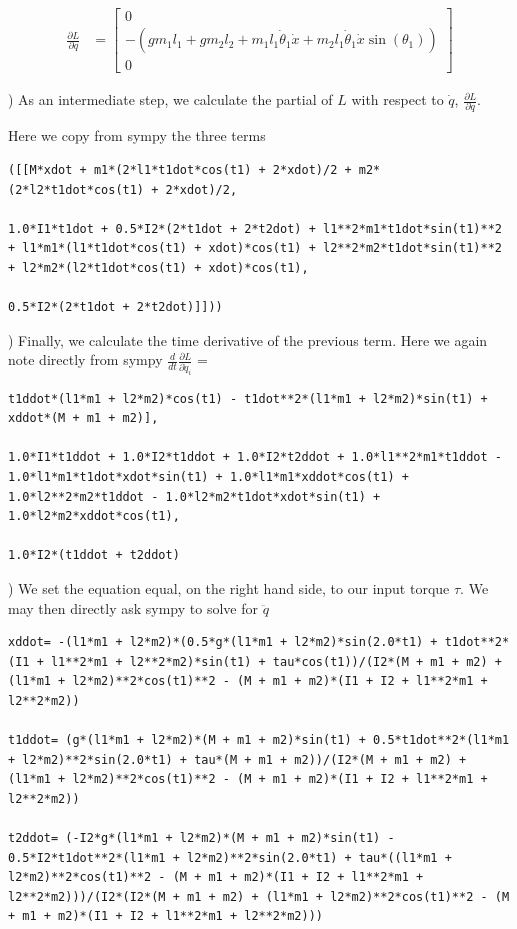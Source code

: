 \documentclass[conference]{IEEEtran}
\begin{document}
\begin{align*}
    \frac{\partial L}{\partial q} &=
    \begin{bmatrix}
        0 \\
        -(g m_1 l_1 + g m_2 l_2 + m_1 l_1 \dot \theta_1 \dot x + m_2 l_1 \dot \theta_1 \dot x \sin(\theta_1))\\
        0
    \end{bmatrix}
\end{align*}

) As an intermediate step, we calculate the partial of $L$ with
respect to $\dot q$,  $\frac{\partial L}{\partial \dot q}$.

Here we copy from sympy the three terms

\begin{lstlisting}
([[M*xdot + m1*(2*l1*t1dot*cos(t1) + 2*xdot)/2 + m2*(2*l2*t1dot*cos(t1) + 2*xdot)/2, 

1.0*I1*t1dot + 0.5*I2*(2*t1dot + 2*t2dot) + l1**2*m1*t1dot*sin(t1)**2 + l1*m1*(l1*t1dot*cos(t1) + xdot)*cos(t1) + l2**2*m2*t1dot*sin(t1)**2 + l2*m2*(l2*t1dot*cos(t1) + xdot)*cos(t1), 

0.5*I2*(2*t1dot + 2*t2dot)]]))
\end{lstlisting}


) Finally, we calculate the time derivative of the previous term.
Here we again note directly from sympy $\frac{d}{dt} \frac{\partial L}{\partial
\dot q_i}$ = 

\begin{lstlisting}
t1ddot*(l1*m1 + l2*m2)*cos(t1) - t1dot**2*(l1*m1 + l2*m2)*sin(t1) + xddot*(M + m1 + m2)],

1.0*I1*t1ddot + 1.0*I2*t1ddot + 1.0*I2*t2ddot + 1.0*l1**2*m1*t1ddot - 1.0*l1*m1*t1dot*xdot*sin(t1) + 1.0*l1*m1*xddot*cos(t1) + 1.0*l2**2*m2*t1ddot - 1.0*l2*m2*t1dot*xdot*sin(t1) + 1.0*l2*m2*xddot*cos(t1),

1.0*I2*(t1ddot + t2ddot)
\end{lstlisting}

) We set the equation equal, on the right hand side, to our input torque $\tau$.  We may then directly ask sympy to solve for $\ddot q$

\begin{lstlisting}
xddot= -(l1*m1 + l2*m2)*(0.5*g*(l1*m1 + l2*m2)*sin(2.0*t1) + t1dot**2*(I1 + l1**2*m1 + l2**2*m2)*sin(t1) + tau*cos(t1))/(I2*(M + m1 + m2) + (l1*m1 + l2*m2)**2*cos(t1)**2 - (M + m1 + m2)*(I1 + I2 + l1**2*m1 + l2**2*m2))

t1ddot= (g*(l1*m1 + l2*m2)*(M + m1 + m2)*sin(t1) + 0.5*t1dot**2*(l1*m1 + l2*m2)**2*sin(2.0*t1) + tau*(M + m1 + m2))/(I2*(M + m1 + m2) + (l1*m1 + l2*m2)**2*cos(t1)**2 - (M + m1 + m2)*(I1 + I2 + l1**2*m1 + l2**2*m2))

t2ddot= (-I2*g*(l1*m1 + l2*m2)*(M + m1 + m2)*sin(t1) - 0.5*I2*t1dot**2*(l1*m1 + l2*m2)**2*sin(2.0*t1) + tau*((l1*m1 + l2*m2)**2*cos(t1)**2 - (M + m1 + m2)*(I1 + I2 + l1**2*m1 + l2**2*m2)))/(I2*(I2*(M + m1 + m2) + (l1*m1 + l2*m2)**2*cos(t1)**2 - (M + m1 + m2)*(I1 + I2 + l1**2*m1 + l2**2*m2)))
\end{lstlisting}
\end{document}
